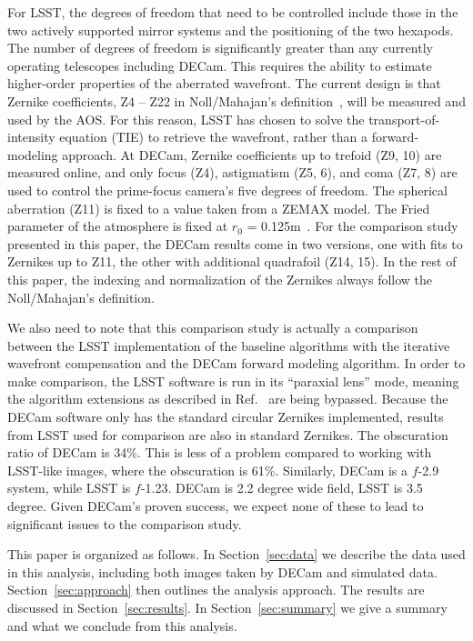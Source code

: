\documentclass[]{spie}  %
\begin{document}
For LSST, the degrees of freedom that need to be controlled include those in the two actively supported mirror systems and the positioning of the two hexapods.
The number of degrees of freedom is significantly greater than any currently operating telescopes including DECam.
This requires the ability to estimate higher-order properties of the aberrated wavefront.
The current design is that Zernike coefficients, Z4 -- Z22 
in Noll/Mahajan's definition~\cite{standardZ, annularZ}, will be measured and used by the AOS.
For this reason, LSST has chosen to solve the transport-of-intensity equation (TIE) to retrieve the wavefront, rather than a forward-modeling approach.
At DECam, Zernike coefficients up to trefoid (Z9, 10) are measured online, and only focus (Z4), astigmatism (Z5, 6), and coma (Z7, 8) are used to control the prime-focus camera's five degrees of freedom. 
The spherical aberration (Z11) is fixed to a value taken from a ZEMAX model. The Fried parameter of the atmosphere is fixed at $r_0$ = 0.125m~\cite{roodman14}.
For the comparison study presented in this paper, the DECam results come in two versions, one with fits to Zernikes up to Z11, the other with additional quadrafoil (Z14, 15).
In the rest of this paper, the indexing and normalization of the Zernikes always follow
the Noll/Mahajan's definition.

We also need to note that this comparison study is actually a comparison between the LSST implementation of the baseline algorithms with the iterative wavefront compensation and the DECam forward modeling algorithm.
In order to make comparison, the LSST software is run in its ``paraxial lens'' mode, meaning the algorithm extensions as described in Ref.~ are being bypassed. 
Because the DECam software only has the standard circular Zernikes implemented, results from LSST used for comparison are also in standard Zernikes. The obscuration ratio of DECam is 34\%. This is less of a problem compared to working with LSST-like images, where the obscuration is 61\%. 
Similarly, DECam is a $f$-2.9 system, while LSST is $f$-1.23. DECam is 2.2 degree wide field, LSST is 3.5 degree.
Given DECam's proven success, we expect none of these to lead to significant issues to the comparison study.

This paper is organized as follows.
In Section~\ref{sec:data} we describe the data used in this analysis, including both images taken by DECam and simulated data.
Section~\ref{sec:approach} then outlines the analysis approach.
The results are discussed in Section~\ref{sec:results}.
In Section~\ref{sec:summary} we give a summary and what we conclude from this analysis.
\end{document}
